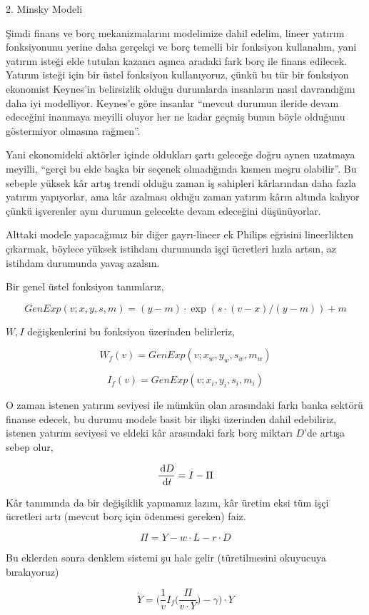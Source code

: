 \documentclass[12pt,fleqn]{article}\usepackage{../../common}
\begin{document}
2. Minsky Modeli 

Şimdi finans ve borç mekanizmalarını modelimize dahil edelim, lineer
yatırım fonksiyonunu yerine daha gerçekçi ve borç temelli bir fonksiyon
kullanalım, yani yatırım isteği elde tutulan kazancı aşınca aradaki fark
borç ile finans edilecek. Yatırım isteği için bir üstel fonksiyon
kullanıyoruz, çünkü bu tür bir fonksiyon ekonomist Keynes'in belirsizlik
olduğu durumlarda insanların nasıl davrandığını daha iyi
modelliyor. Keynes'e göre insanlar ``mevcut durumun ileride devam edeceğini
inanmaya meyilli oluyor her ne kadar geçmiş bunun böyle olduğunu
göstermiyor olmasına rağmen''.

Yani ekonomideki aktörler içinde oldukları şartı geleceğe doğru aynen
uzatmaya meyilli, ``gerçi bu elde başka bir seçenek olmadığında kısmen
meşru olabilir''. Bu sebeple yüksek kâr artış trendi olduğu zaman iş
sahipleri kârlarından daha fazla yatırım yapıyorlar, ama kâr azalması
olduğu zaman yatırım kârın altında kalıyor çünkü işverenler aynı durumun
gelecekte devam edeceğini düşünüyorlar.

Alttaki modele yapacağımız bir diğer gayrı-lineer ek Philips eğrisini
lineerlikten çıkarmak, böylece yüksek istihdam durumunda işçi ücretleri
hızla artsın, az istihdam durumunda yavaş azalsın. 

Bir genel üstel fonksiyon tanımlarız, 

$$ GenExp(v;x,y,s,m) = (y-m) \cdot \exp (s \cdot (v-x)/(y-m)) + m$$

$W,I$ değişkenlerini bu fonksiyon üzerinden belirleriz, 

$$ W_f(v) = GenExp (v;x_w,y_w,s_w,m_w)$$

$$ I_f(v) = GenExp (v;x_i,y_i,s_i,m_i)$$

O zaman istenen yatırım seviyesi ile mümkün olan arasındaki farkı banka
sektörü finanse edecek, bu durumu modele basit bir ilişki üzerinden dahil
edebiliriz, istenen yatırım seviyesi ve eldeki kâr arasındaki fark borç
miktarı $D$'de artışa sebep olur,

$$ \frac{\,\mathrm{d} D}{\,\mathrm{d} t} = I - \Pi$$

Kâr tanımında da bir değişiklik yapmamız lazım, kâr üretim eksi tüm işçi
ücretleri artı (mevcut borç için ödenmesi gereken) faiz.

$$ \Pi = Y - w \cdot L - r \cdot D$$

Bu eklerden sonra denklem sistemi şu hale gelir (türetilmesini okuyucuya bırakıyoruz)

$$ \dot{Y} = \bigg( \frac{1}{v} I_f \big( \frac{\Pi}{v \cdot Y} \big) - \gamma \bigg) \cdot Y$$
\end{document}
